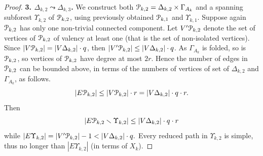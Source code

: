 \documentclass[a4paper,12pt]{article}
\newcommand{\G}{\Gamma }
\newcommand{\D}{\Delta }
\newcommand{\T}{\Theta }
\newcommand{\U}{\Upsilon }
\newcommand{\cP}{{\cal{P}}}
\numberwithin{equation}{section}
\numberwithin{figure}{section}
\begin{document}
\begin{proof}
{\bf 3. $\D_{k,2} \leadsto \D_{k,3}$.} We construct both $\cP_{k,2}=\D_{k,2}\times \G_{A_k}$ and a spanning
subforest $\U_{k,2}$ of $\cP_{k,2}$, using previously obtained $\cP_{k,1}$ and $\U_{k,1}$. Suppose again
$\cP_{k,2}$ has only one non-trivial connected component.
 Let $V'\cP_{k,2}$ denote the set of vertices of $\cP_{k,2}$ of valency at least one
(that is the set of non-isolated vertices). Since $|V\cP_{k,2}|=|V\D_{k,2}|\cdot q$, then $|V'\cP_{k,2}|
\le |V\D_{k,2}|\cdot q$. As $\G_{A_k}$ is folded, so is $\cP_{k,2}$, so
vertices of $\cP_{k,2}$ have degree at most $2r$. Hence the number of
edges in $\cP_{k,2}$ can be bounded above, in terms of the numbers of
vertices of set of $\D_{k,2}$ and $\G_{A_k}$, as follows.
\[ |E\cP_{k,2}| \le |V\cP_{k,2}|\cdot r =|V\D_{k,2}|\cdot q \cdot r.\]
Then
\[|E\cP_{k,2}\smallsetminus \U_{k,2}| \le |V\D_{k,2}|\cdot q \cdot r\]
while $|E \U_{k,2}| = |V'\cP_{k,2}| - 1 < |V\D_{k,2}|\cdot q.$ Every reduced
path in $\U_{k,2}$ is simple, thus no longer than $|E\U_{k,2}|$ (in terms
of $X_k$).


\end{proof}
\end{document}
